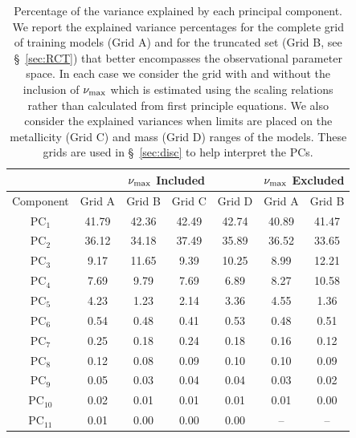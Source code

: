 \begin{table}
\centering
\caption{Percentage of the variance explained by each principal component. We report the explained variance percentages for the complete grid of training models (Grid A) and for the truncated set (Grid B, see \S~\ref{sec:RCT}) that better encompasses the observational parameter space. In each case we consider the grid with and without the inclusion of $\nu_{\rm{max}}$ which is estimated using the \citet{1995AA...293...87K} scaling relations rather than calculated from first principle equations. We also consider the explained variances when limits are placed on the metallicity (Grid C) and mass (Grid D) ranges of the models.  These grids are used in \S~\ref{sec:disc} to help interpret the PCs. \label{tab:PCAEV}} 

\begin{tabular}{c|cccc|cc}
        \multicolumn{1}{c}{}  &
        \multicolumn{4}{c|}{$\nu_{\rm{max}}$ Included}               &
        \multicolumn{2}{c}{$\nu_{\rm{max}}$ Excluded}\\\hline
        Component  &
        Grid A &
        Grid B &
        Grid C &
        Grid D &
        Grid A &
        Grid B \\\hline
PC$_1$ 	&	41.79	&	42.36	& 42.49 & 42.74 &	40.89	&	41.47	\\
PC$_2$ 	&	36.12	&	34.18	& 37.49 & 35.89 &	36.52	&	33.65	\\
PC$_3$	&	9.17	&	11.65	& 9.39  & 10.25 &	8.99	&	12.21	\\
PC$_4$	&	7.69	&	9.79	& 7.69  &  6.89 &	8.27	&	10.58	\\
PC$_5$ 	&	4.23	&	1.23	& 2.14  &  3.36 &	4.55	&	1.36	\\
PC$_6$	&	0.54	&	0.48	&0.41    & 0.53   &	0.48	&	0.51	\\
PC$_7$	&	0.25	&	0.18	&0.24    &0.18    &	0.16	&	0.12	\\
PC$_8$ 	&	0.12	&	0.08	&0.09    &0.10    &	0.10	&	0.09	\\
PC$_9$	&	0.05	&	0.03	&0.04    &0.04    &	0.03	&	0.02	\\
PC$_{10}$ 	&	0.02	&	0.01 &0.01   &0.01	&	0.01	&	0.00	\\
PC$_{11}$	&	0.01	&	0.00 &0.00   &0.00     &	--	    &	--	
\end{tabular}
\end{table}

